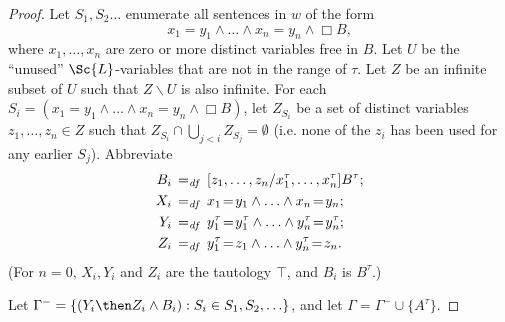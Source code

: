 \documentclass[11pt]{woarticle}
\newcommand{\cmnt}[1]{\iffalse #1 \fi}
\theoremstyle{break}
\theoremstyle{nonumberplain}
\newcommand{\df}{\ensuremath{\,=_{\text{\emph{df}}}\,}}
\newcommand{\1}{\;\,|\;\,}
\newcommand{\verum}{\top}
\begin{document}
\begin{proof}
  Let $S_1, S_2 \ldots$ enumerate all sentences in $w$ of the form
  \[
  x_1\!=\!y_1 \land \ldots \land x_n\!=\!y_n \land \Box B,
  \]
  where $x_1,\ldots,x_n$ are zero or more distinct variables free in
  $B$. Let $U$ be the ``unused'' $\Sc{L}$-variables that are not in
  the range of $\tau$. Let $Z$ be an infinite subset of $U$
  such that $Z \backslash U$ is also infinite. For each $S_i =
  (x_1\!=\!y_1 \land \ldots \land x_n\!=\!y_n \land \Box B)$, let
  $Z_{S_i}$ be a set of distinct variables $z_1,\ldots,z_n \in Z$ such
  that $Z_{S_i} \cap \bigcup_{j<i} Z_{S_j} = \emptyset$ (i.e. none of
  the $z_i$ has been used for any earlier $S_j$). Abbreviate
  \begin{align*}
    B_i &\df [z_1,\ldots,z_n/x_1^\tau,\ldots,x_n^\tau]B^\tau;\\
    X_i &\df x_1\!=\!y_1 \land \ldots \land x_n\!=\!y_n;\\
    Y_i &\df y_1^\tau\!=\!y_1^\tau \land \ldots \land y_n^\tau\!=\!y_n^\tau;\\
    Z_i &\df y_1^\tau\!=\!z_1 \land \ldots \land y_n^\tau\!=\!z_n.
  \end{align*}
  \cmnt{($S^*_i$ is $Y_i \then Z_i \land B_i$).} (For $n=0$, $X_i,Y_i$
  and $Z_i$ are the tautology $\verum$, and $B_i$ is $B^\tau$.)
  
  Let $\Gamma^- = \{ (Y_i \then Z_i \land B_i) : S_i \in
  S_1,S_2,\ldots \}$, and let $\Gamma = \Gamma^- \cup \{ A^\tau
  \}$.


\end{proof}
\end{document}
